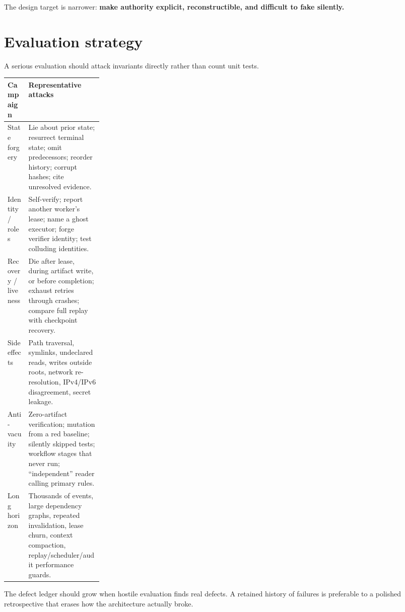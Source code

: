 The design target is narrower: \textbf{make authority explicit, reconstructible, and difficult to fake silently.}

\section{Evaluation strategy}

A serious evaluation should attack invariants directly rather than count unit tests.

\begin{table}[htbp]
\centering
\small
\begin{tabularx}{\linewidth}{@{}p{0.22\linewidth}X@{}}
\toprule
Campaign & Representative attacks \\
\midrule
State forgery & Lie about prior state; resurrect terminal state; omit predecessors; reorder history; corrupt hashes; cite unresolved evidence.\\
Identity / roles & Self-verify; report another worker's lease; name a ghost executor; forge verifier identity; test colluding identities.\\
Recovery / liveness & Die after lease, during artifact write, or before completion; exhaust retries through crashes; compare full replay with checkpoint recovery.\\
Side effects & Path traversal, symlinks, undeclared reads, writes outside roots, network re-resolution, IPv4/IPv6 disagreement, secret leakage.\\
Anti-vacuity & Zero-artifact verification; mutation from a red baseline; silently skipped tests; workflow stages that never run; ``independent'' reader calling primary rules.\\
Long horizon & Thousands of events, large dependency graphs, repeated invalidation, lease churn, context compaction, replay/scheduler/audit performance guards.\\
\bottomrule
\end{tabularx}
\end{table}

The defect ledger should grow when hostile evaluation finds real defects. A retained history of failures is preferable to a polished retrospective that erases how the architecture actually broke.

